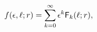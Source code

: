 \[\mathop{f\/}\nolimits\!\left(\epsilon,\ell;r\right)=\sum_{k=0}^{\infty}%
\epsilon^{k}{\sf F}_{k}(\ell;r),\]
